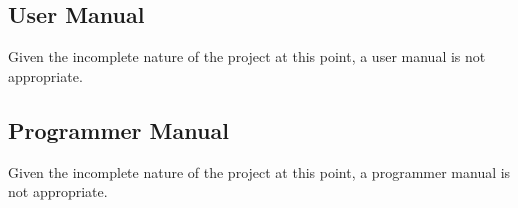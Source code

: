 \documentclass{article}
\begin{document}
\subsection{User Manual}
Given the incomplete nature of the project at this point, a user manual is not appropriate.

\subsection{Programmer Manual}
Given the incomplete nature of the project at this point, a programmer manual is not appropriate.

\newpage





\end{document}
